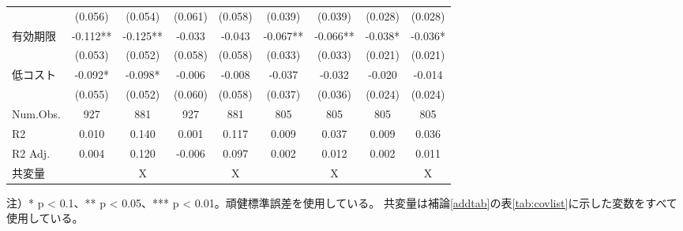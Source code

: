 \documentclass[
  11pt,
  a4paper,
]{article}
\begin{document}
\begin{table}
\begin{threeparttable}
\begin{tabular}[t]{lcccccccc}
 & (0.056) & (0.054) & (0.061) & (0.058) & (0.039) & (0.039) & (0.028) & (0.028)\\
有効期限 & -0.112** & -0.125** & -0.033 & -0.043 & -0.067** & -0.066** & -0.038* & -0.036*\\
 & (0.053) & (0.052) & (0.058) & (0.058) & (0.033) & (0.033) & (0.021) & (0.021)\\
低コスト & -0.092* & -0.098* & -0.006 & -0.008 & -0.037 & -0.032 & -0.020 & -0.014\\
 & (0.055) & (0.052) & (0.060) & (0.058) & (0.037) & (0.036) & (0.024) & (0.024)\\
\midrule
Num.Obs. & 927 & 881 & 927 & 881 & 805 & 805 & 805 & 805\\
R2 & 0.010 & 0.140 & 0.001 & 0.117 & 0.009 & 0.037 & 0.009 & 0.036\\
R2 Adj. & 0.004 & 0.120 & -0.006 & 0.097 & 0.002 & 0.012 & 0.002 & 0.011\\
共変量 &  & X &  & X &  & X &  & X\\
\bottomrule
\end{tabular}
\begin{tablenotes}
\item 注）* p < 0.1、** p < 0.05、*** p < 0.01。頑健標準誤差を使用している。 共変量は補論\ref{addtab}の表\ref{tab:covlist}に示した変数をすべて使用している。
\end{tablenotes}
\end{threeparttable}
\end{table}
\end{document}
